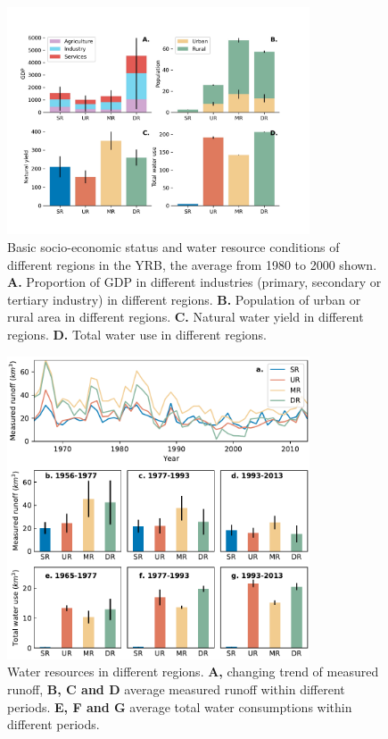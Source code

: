 \documentclass[9pt,twoside,lineno]{pnas-new}
\begin{document}
\begin{figure}
    \centering
    \includegraphics[width=0.8\textwidth]{../../figures/sup/region_differences.jpg}
    \caption{
        Basic socio-economic status and water resource conditions of different regions in the YRB, the average from 1980 to 2000 shown.
        \textbf{A.} Proportion of GDP in different industries (primary, secondary or tertiary industry) in different regions.
        \textbf{B.} Population of urban or rural area in different regions.
        \textbf{C.} Natural water yield in different regions.
        \textbf{D.} Total water use in different regions.
    }
\end{figure}


\begin{figure}
    \centering
    \includegraphics[width=0.8\textwidth]{../../figures/sup/sf_measured_runoff.pdf}
    \caption{Water resources in different regions. 
        \textbf{A,} changing trend of measured runoff, 
        \textbf{B, C and D} average measured runoff within different periods.
        \textbf{E, F and G} average total water consumptions within different periods. 
    }
\end{figure}
\end{document}
